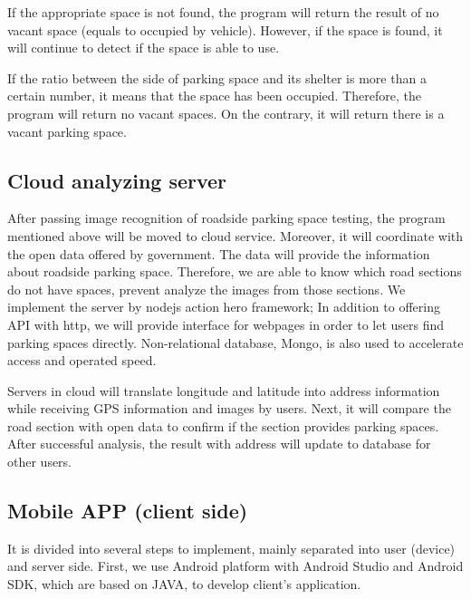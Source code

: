 \documentclass[preprint,12pt]{elsarticle}
\begin{document}
If the appropriate space is not found, the program will return the
result of no vacant space (equals to occupied by vehicle). However, if
the space is found, it will continue to detect if the space is
able to use.

If the ratio between the side of parking space and its shelter is more
than a certain number, it means that the space has been occupied.
Therefore, the program will return no vacant spaces. On the contrary,
it will return there is a vacant parking space.

\subsection{Cloud analyzing server}

After passing image recognition of roadside parking space testing, the
program mentioned above will be moved to cloud service. Moreover, it will
coordinate with the open data offered by government. The data will
provide the information about roadside parking space. Therefore, we are
able to know which road sections do not have spaces, prevent analyze the
images from those sections. We implement the server by nodejs action
hero framework; In addition to offering API with http, we will provide
interface for webpages in order to let users find parking spaces
directly. Non-relational database, Mongo, is also used to accelerate
access and operated speed.

Servers in cloud will translate longitude and latitude into address
information while receiving GPS information and images by users. Next,
it will compare the road section with open data to confirm if the
section provides parking spaces. After successful analysis, the result
with address will update to database for other users.

\subsection{Mobile APP (client side)}

It is divided into several steps to implement, mainly separated into
user (device) and server side. First, we use Android platform with
Android Studio and Android SDK, which are based on JAVA, to develop
client's application.
\end{document}
